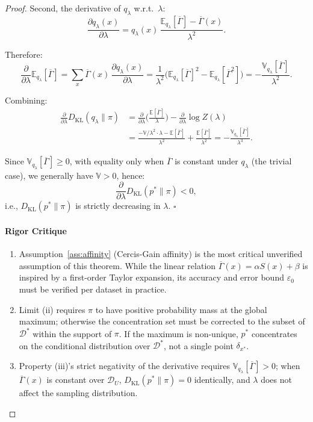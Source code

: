 \documentclass[12pt,a4paper]{article}
\newcommand{\E}{\mathbb{E}}
\newcommand{\V}{\mathbb{V}}
\newcommand{\cD}{\mathcal{D}}
\newcommand{\KL}{D_{\mathrm{KL}}}
\newenvironment{critique}{\paragraph{Rigor Critique}\quad}{\par}
\begin{document}
\begin{proof}
Second, the derivative of $q_\lambda$ w.r.t.\ $\lambda$:
\[
\frac{\partial q_\lambda(x)}{\partial\lambda}
= q_\lambda(x)\,\frac{\E_{q_\lambda}[\overline{\Gamma}]-\overline{\Gamma}(x)}{\lambda^2}.
\]

Therefore:
\[
\frac{\partial}{\partial\lambda}\E_{q_\lambda}[\overline{\Gamma}]
= \sum_x \overline{\Gamma}(x)\,\frac{\partial q_\lambda(x)}{\partial\lambda}
= \frac{1}{\lambda^2}\Big(\E_{q_\lambda}[\overline{\Gamma}]^2 - \E_{q_\lambda}[\overline{\Gamma}^2]\Big)
= -\frac{\V_{q_\lambda}[\overline{\Gamma}]}{\lambda^2}.
\]

Combining:
\begin{align*}
\frac{\partial}{\partial\lambda}\KL(q_\lambda\|\pi)
&= \frac{\partial}{\partial\lambda}\Big(\frac{\E[\overline{\Gamma}]}{\lambda}\Big)
- \frac{\partial}{\partial\lambda}\log Z(\lambda) \\
&= \frac{-\V/\lambda^2\cdot\lambda - \E[\overline{\Gamma}]}{\lambda^2}
+ \frac{\E[\overline{\Gamma}]}{\lambda^2}
= -\frac{\V_{q_\lambda}[\overline{\Gamma}]}{\lambda^3}.
\end{align*}

Since $\V_{q_\lambda}[\overline{\Gamma}]\ge 0$, with equality only when $\overline{\Gamma}$ is constant under $q_\lambda$ (the trivial case), we generally have $\V>0$, hence:
\[
\frac{\partial}{\partial\lambda}\KL(p^*\|\pi) < 0,
\]
i.e., $\KL(p^*\|\pi)$ is strictly decreasing in $\lambda$. \hfill$\square$

\begin{critique}
\begin{enumerate}
    \item Assumption~\ref{ass:affinity} (Cercis-Gain affinity) is the most critical unverified assumption of this theorem. While the linear relation $\overline{\Gamma}(x)=\alpha S(x)+\beta$ is inspired by a first-order Taylor expansion, its accuracy and error bound $\varepsilon_0$ must be verified per dataset in practice.
    \item Limit (ii) requires $\pi$ to have positive probability mass at the global maximum; otherwise the concentration set must be corrected to the subset of $\cD^*$ within the support of $\pi$. If the maximum is non-unique, $p^*$ concentrates on the conditional distribution over $\cD^*$, not a single point $\delta_{x^*}$.
    \item Property (iii)'s strict negativity of the derivative requires $\V_{q_\lambda}[\overline{\Gamma}]>0$; when $\overline{\Gamma}(x)$ is constant over $\cD_U$, $\KL(p^*\|\pi)=0$ identically, and $\lambda$ does not affect the sampling distribution.
\end{enumerate}
\end{critique}


\end{proof}
\end{document}
